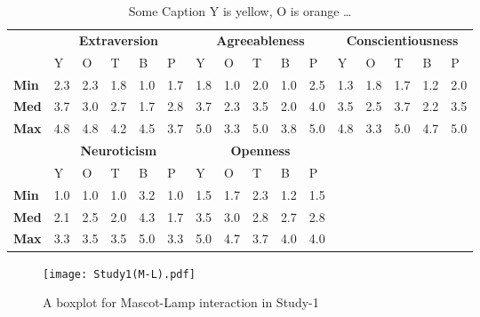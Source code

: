\begin{table}[H]
    \renewcommand{\arraystretch}{1.2}
    \caption{Some Caption Y is yellow, O is orange \ldots}
    \label{table:medianML1}
    \begin{center}
        \begin{tabular}{p{}|
        p{}|p{}|p{}|p{}|p{}||
        p{}|p{}|p{}|p{}|p{}||
        p{}|p{}|p{}|p{}|p{}|}
            \cline{2-16}
            & \multicolumn{5}{c||}{\textbf{Extraversion}} & \multicolumn{5}{c||}{\textbf{Agreeableness}}
            & \multicolumn{5}{c|}{\textbf{Conscientiousness}} \\
            \cline{2-16}
                            & Y & O & T & B & P 			    & Y & O & T & B & P  	 	& Y & O & T & B & P     \\
            \cline{2-16}
            \textbf{Min}  	& 2.3 & 2.3 & 1.8 & 1.0 & 1.7 		& 1.8 & 1.0 & 2.0 & 1.0 & 2.5  	& 1.3 & 1.8 & 1.7 & 1.2 & 2.0  \\
            \textbf{Med} 	& 3.7 & 3.0 & 2.7 & 1.7 & 2.8 		& 3.7 & 2.3 & 3.5 & 2.0 & 4.0  	& 3.5 & 2.5 & 3.7 & 2.2 & 3.5  \\
            \textbf{Max}	& 4.8 & 4.8 & 4.2 & 4.5 & 3.7 		& 5.0 & 3.3 & 5.0 & 3.8 & 5.0  	& 4.8 & 3.3 & 5.0 & 4.7 & 5.0 \\
            \cline{2-16}
            \cline{2-11}
            &  \multicolumn{5}{|c||}{\textbf{Neuroticism}} & \multicolumn{5}{|c||}{\textbf{Openness}} \\
            \cline{2-11}
                            & Y & O & T & B & P 			& Y & O & T & B & P    		\\
            \cline{2-11}
            \textbf{Min} 	& 1.0 & 1.0 & 1.0 & 3.2 & 1.0 		& 1.5 & 1.7 & 2.3 & 1.2 & 1.5 	\\
            \textbf{Med}    & 2.1 & 2.5 & 2.0 & 4.3 & 1.7 	    & 3.5 & 3.0 & 2.8 & 2.7 & 2.8 	\\
            \textbf{Max}  	& 3.3 & 3.5 & 3.5 & 5.0 & 3.3 		& 5.0 & 4.7 & 3.7 & 4.0 & 4.0  	\\
            \cline{2-11}
        \end{tabular}
    \end{center}
\end{table}

\begin{figure}[H]
    \centering
    \texttt{[image: Study1(M-L).pdf]}
    \caption{A boxplot for Mascot-Lamp interaction in Study-1}
    \label{fig:ML1}
\end{figure}

